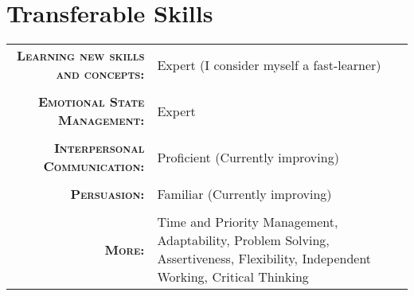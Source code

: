 \documentclass[a4paper,10pt]{article}
\begin{document}
\section{Transferable Skills}
\begin{tabular}{r p{8.5cm}}
    \textsc{\textbf{Learning new skills and concepts:}} & Expert (I consider myself a fast-learner)\\
    \\
    \textsc{\textbf{Emotional State Management:}} & Expert \\
    \\
    \textsc{\textbf{Interpersonal Communication:}} & Proficient (Currently improving)\\
    \\
    \textsc{\textbf{Persuasion:}} & Familiar (Currently improving)\\
    \\

    \textsc{\textbf{More:}} & Time and Priority Management, Adaptability, Problem Solving, Assertiveness, Flexibility, Independent Working, Critical Thinking
\end{tabular}
\end{document}
